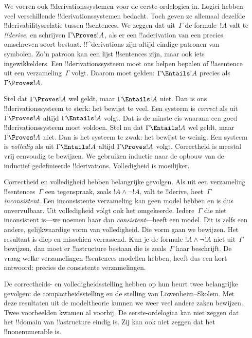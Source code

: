 \documentclass[../../../include/open-logic-section]{subfiles}
\begin{document}


We voeren ook !!{derivation}ssystemen voor de eerste-ordelogica in.
Logici hebben veel verschillende !!{derivation}ssystemen bedacht. Toch
geven ze allemaal dezelfde !!{derivability}srelatie tussen
!!{sentence}s. We zeggen dat uit~$\Gamma$ de formule~$!A$ valt te
\emph{!!{derive}}, en schrijven $\Gamma \Proves !A$, als er een
!!a{derivation} van een precies omschreven soort bestaat.
!!^{derivation}s zijn altijd eindige patronen van symbolen. Zo'n
patroon kan een lijst !!{sentence}s zijn, maar ook iets ingewikkelders.
Een !!{derivation}ssysteem moet ons helpen bepalen of !!a{sentence} uit
een verzameling~$\Gamma$ volgt. Daarom moet gelden:
$\Gamma \Entails !A$ precies als $\Gamma \Proves !A$.

Stel dat $\Gamma \Proves !A$ wel geldt, maar $\Gamma \Entails !A$
niet. Dan is ons !!{derivation}ssysteem te sterk: het bewijst te veel.
Een systeem is \emph{correct} als uit $\Gamma \Proves !A$ altijd
$\Gamma \Entails !A$ volgt. Dat is de minste eis waaraan een goed
!!{derivation}ssysteem moet voldoen. Stel nu dat $\Gamma \Entails !A$
wel geldt, maar $\Gamma \Proves !A$ niet. Dan is het systeem te zwak:
het bewijst te weinig. Een systeem is \emph{volledig} als uit
$\Gamma \Entails !A$ altijd $\Gamma \Proves !A$ volgt. Correctheid is
meestal vrij eenvoudig te bewijzen. We gebruiken inductie naar de
opbouw van de inductief gedefinieerde !!{derivation}s. Volledigheid is
moeilijker.

Correctheid en volledigheid hebben belangrijke gevolgen. Als uit een
verzameling !!{sentence}s~$\Gamma$ een tegenspraak, zoals
$!A \land \lnot !A$, valt te !!{derive}, heet~$\Gamma$
\emph{inconsistent}. Een inconsistente verzameling kan geen model
hebben en is dus onvervulbaar. Uit volledigheid volgt ook het omgekeerde.
Iedere~$\Gamma$ die niet inconsistent is---we noemen haar dan
\emph{consistent}---heeft een model. Dit is zelfs een andere,
gelijkwaardige vorm van volledigheid. Die vorm gaan we bewijzen.
Het resultaat is diep en misschien verrassend. Kun je de formule
$!A \land \lnot !A$ niet uit~$\Gamma$ bewijzen, dan moet er
!!a{structure} bestaan die is zoals~$\Gamma$ haar beschrijft. De vraag
welke verzamelingen !!{sentence}s modellen hebben, heeft dus een kort
antwoord: precies de consistente verzamelingen.

De correctheids- en volledigheidsstelling hebben op hun beurt twee
belangrijke gevolgen: de compactheidsstelling en de stelling van
L\"owenheim--Skolem. Met deze resultaten uit de modeltheorie kunnen we
weer veel andere zaken bewijzen. Twee voorbeelden kwamen al voorbij.
De eerste-ordelogica kan niet zeggen dat het !!{domain} van
!!a{structure} eindig is. Zij kan ook niet zeggen dat het
!!{nonenumerable} is.
\end{document}
